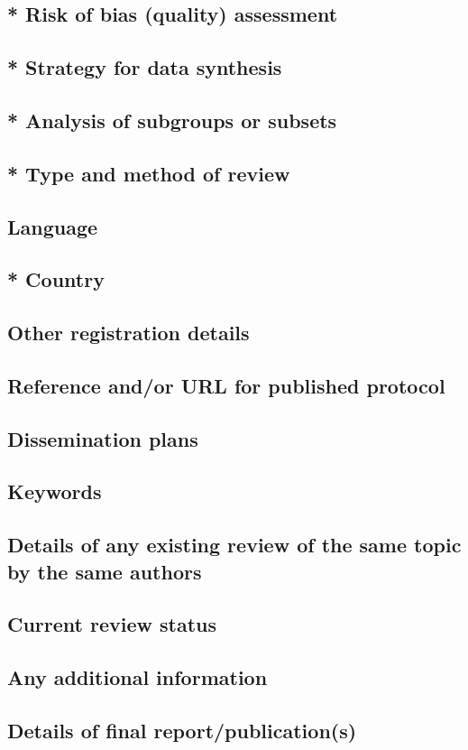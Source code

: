 \documentclass{qqtarticle}
\begin{document}
    \subsection{* Risk of bias (quality) assessment}

    \subsection{* Strategy for data synthesis}

    \subsection{* Analysis of subgroups or subsets}

    \subsection{* Type and method of review}

    \subsection{Language}

    \subsection{* Country}

    \subsection{Other registration details}

    \subsection{Reference and/or URL for published protocol}

    \subsection{Dissemination plans}

    \subsection{Keywords}

    \subsection{Details of any existing review of the same topic by the same authors}

    \subsection{Current review status}

    \subsection{Any additional information}

    \subsection{Details of final report/publication(s)}
        

    
\end{document}

